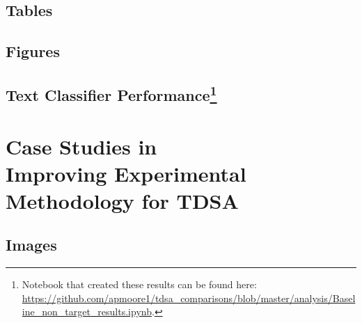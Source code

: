 \documentclass[11pt]{report}
\begin{document}
\section{Tables}
\label{appendix_augmentation_tables}

\section{Figures}
\label{appendix_augmentation_figures}

\section[Text Classifier Performance]{Text Classifier Performance\footnote{Notebook that created these results can be found here: \url{https://github.com/apmoore1/tdsa_comparisons/blob/master/analysis/Baseline_non_target_results.ipynb}.}}
\label{section:appendix_cnn_tdsa_baseline}

\chapter[Case Studies in Improving Experimental Methodology for TDSA]{Case Studies in\\Improving Experimental\\Methodology for TDSA}
%
\section{Images}
\label{appendix_case_images}

%
%
%
%



\printbibliography
\end{document}
